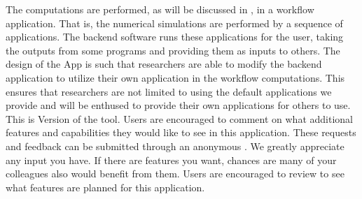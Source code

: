 The computations are performed, as will be discussed in , in a workflow application. That is, the numerical simulations are performed by a sequence of applications. The \texttt{\getsoftwarename{}} backend software runs these applications for the user, taking the outputs from some programs and providing them as inputs to others. The design of the \texttt{\getsoftwarename{}} App is such that researchers are able to modify the backend application to utilize their own application in the workflow computations. This ensures that researchers are not limited to using the default applications we provide and will be enthused to provide their own applications for others to use.\\

This is Version \getsoftwareversion{} of the tool. Users are
encouraged to comment on what additional features and capabilities
they would like to see in this application. These requests and
feedback can be submitted through an anonymous . We greatly appreciate any input you have. If there are
features you want, chances are many of your colleagues also would
benefit from them. Users are encouraged to review
 to see what features are planned for this
application.